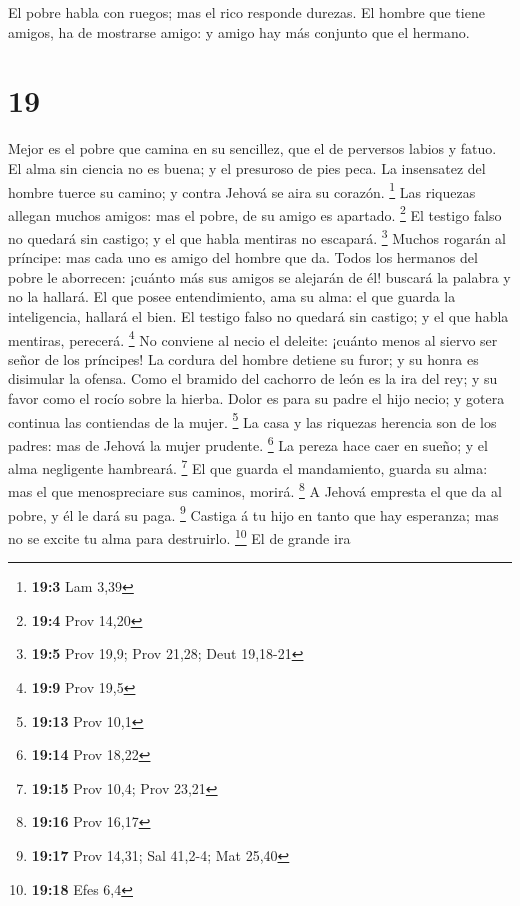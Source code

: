  El pobre habla con ruegos; mas el rico responde durezas.
 El hombre que tiene amigos, ha de mostrarse amigo: y amigo
hay más conjunto que el hermano.

\hypertarget{section-18}{%
\section{19}\label{section-18}}

 Mejor es el pobre que camina en su sencillez, que el de
perversos labios y fatuo.  El alma sin ciencia no es buena;
y el presuroso de pies peca.  La insensatez del hombre
tuerce su camino; y contra Jehová se aira su corazón. \footnote{\textbf{19:3}
  Lam 3,39}  Las riquezas allegan muchos amigos: mas el
pobre, de su amigo es apartado. \footnote{\textbf{19:4} Prov 14,20}
 El testigo falso no quedará sin castigo; y el que habla
mentiras no escapará. \footnote{\textbf{19:5} Prov 19,9; Prov 21,28;
  Deut 19,18-21}  Muchos rogarán al príncipe: mas cada uno
es amigo del hombre que da.  Todos los hermanos del pobre le
aborrecen: ¡cuánto más sus amigos se alejarán de él! buscará la palabra
y no la hallará.  El que posee entendimiento, ama su alma:
el que guarda la inteligencia, hallará el bien.  El testigo
falso no quedará sin castigo; y el que habla mentiras, perecerá.
\footnote{\textbf{19:9} Prov 19,5}  No conviene al necio el
deleite: ¡cuánto menos al siervo ser señor de los príncipes!
 La cordura del hombre detiene su furor; y su honra es
disimular la ofensa.  Como el bramido del cachorro de león
es la ira del rey; y su favor como el rocío sobre la hierba.
 Dolor es para su padre el hijo necio; y gotera continua
las contiendas de la mujer. \footnote{\textbf{19:13} Prov 10,1}
 La casa y las riquezas herencia son de los padres: mas de
Jehová la mujer prudente. \footnote{\textbf{19:14} Prov 18,22}
 La pereza hace caer en sueño; y el alma negligente
hambreará. \footnote{\textbf{19:15} Prov 10,4; Prov 23,21} 
El que guarda el mandamiento, guarda su alma: mas el que menospreciare
sus caminos, morirá. \footnote{\textbf{19:16} Prov 16,17} 
A Jehová empresta el que da al pobre, y él le dará su paga. \footnote{\textbf{19:17}
  Prov 14,31; Sal 41,2-4; Mat 25,40}  Castiga á tu hijo en
tanto que hay esperanza; mas no se excite tu alma para destruirlo.
\footnote{\textbf{19:18} Efes 6,4}  El de grande ira
